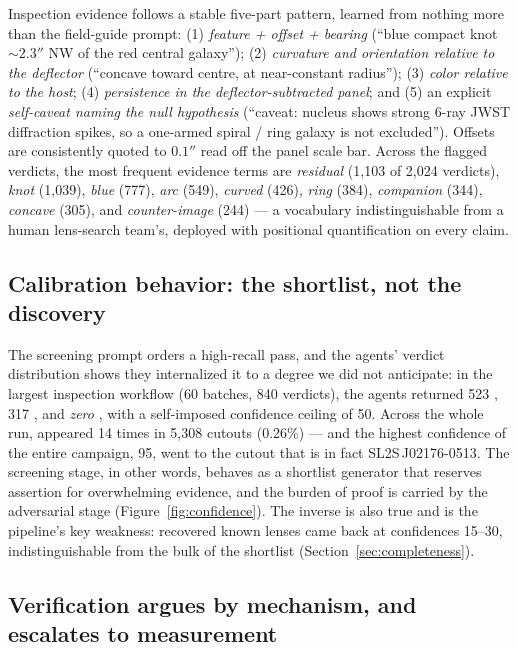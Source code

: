 \documentclass[11pt,letterpaper]{article}
\newcommand{\numinspected}{5{,}308}
\newcommand{\numflagged}{2{,}024}
\begin{document}
Inspection evidence follows a stable five-part pattern, learned from nothing
more than the field-guide prompt:
(1) \emph{feature + offset + bearing} (``blue compact knot $\sim$$2.3''$ NW of
the red central galaxy''); (2) \emph{curvature and orientation relative to the
deflector} (``concave toward centre, at near-constant radius'');
(3) \emph{color relative to the host}; (4) \emph{persistence in the
deflector-subtracted panel}; and (5) an explicit \emph{self-caveat naming the
null hypothesis} (``caveat: nucleus shows strong 6-ray JWST diffraction
spikes, so a one-armed spiral / ring galaxy is not excluded''). Offsets are
consistently quoted to $0.1''$ read off the panel scale bar. Across the
flagged verdicts, the most frequent evidence terms are \emph{residual} (1{,}103
of \numflagged{} verdicts), \emph{knot} (1{,}039), \emph{blue} (777),
\emph{arc} (549), \emph{curved} (426), \emph{ring} (384), \emph{companion}
(344), \emph{concave} (305), and \emph{counter-image} (244) --- a vocabulary
indistinguishable from a human lens-search team's, deployed with positional
quantification on every claim.

\subsection{Calibration behavior: the shortlist, not the discovery}
\label{sec:calibration}

The screening prompt orders a high-recall pass, and the agents' verdict
distribution shows they internalized it to a degree we did not anticipate:
in the largest inspection workflow (60 batches, 840 verdicts), the agents
returned 523 , 317 , and \emph{zero} , with a
self-imposed confidence ceiling of 50. Across the whole run, 
appeared 14 times in \numinspected{} cutouts (0.26\%) --- and the highest
confidence of the entire campaign, 95, went to the cutout that is in fact
SL2S\,J02176-0513. The screening stage, in other words, behaves as a
shortlist generator that reserves assertion for overwhelming evidence, and
the burden of proof is carried by the adversarial stage
(Figure~\ref{fig:confidence}). The inverse is also true and is the pipeline's
key weakness: recovered known lenses came back at confidences 15--30,
indistinguishable from the bulk of the shortlist (Section~\ref{sec:completeness}).

\subsection{Verification argues by mechanism, and escalates to measurement}
\label{sec:verifiers}
\end{document}

